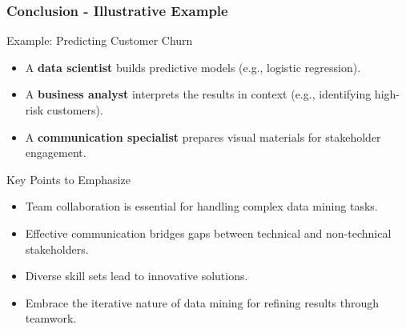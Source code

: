 \documentclass[aspectratio=169]{beamer}
\begin{document}
\begin{frame}[fragile]
    \frametitle{Conclusion - Illustrative Example}
    \begin{block}{Example: Predicting Customer Churn}
        \begin{itemize}
            \item A \textbf{data scientist} builds predictive models (e.g., logistic regression).
            \item A \textbf{business analyst} interprets the results in context (e.g., identifying high-risk customers).
            \item A \textbf{communication specialist} prepares visual materials for stakeholder engagement.
        \end{itemize}
    \end{block}
    
    \begin{block}{Key Points to Emphasize}
        \begin{itemize}
            \item Team collaboration is essential for handling complex data mining tasks.
            \item Effective communication bridges gaps between technical and non-technical stakeholders.
            \item Diverse skill sets lead to innovative solutions.
            \item Embrace the iterative nature of data mining for refining results through teamwork.
        \end{itemize}
    \end{block}
\end{frame}
\end{document}
